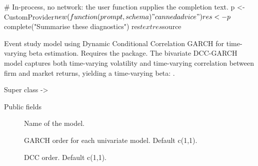 \documentclass[a4paper]{book}
\begin{document}
%
\begin{Examples}
\begin{ExampleCode}
# In-process, no network: the user function supplies the completion text.
p <- CustomProvider$new(function(prompt, schema) "canned advice")
res <- p$complete("Summarise these diagnostics")
res$text
res$source
\end{ExampleCode}
\end{Examples}
%
\begin{Description}
Event study model using Dynamic Conditional Correlation GARCH for
time-varying beta estimation. Requires the  package.
The bivariate DCC-GARCH model captures both time-varying volatility
and time-varying correlation between firm and market returns, yielding
a time-varying beta: .
\end{Description}
%
\begin{Section}{Super class}
 -> 
\end{Section}
%
\begin{Section}{Public fields}

\begin{description}

\item[] Name of the model.

\item[] GARCH order for each univariate model. Default c(1,1).

\item[] DCC order. Default c(1,1).

\end{description}


\end{Section}
%
\end{document}
